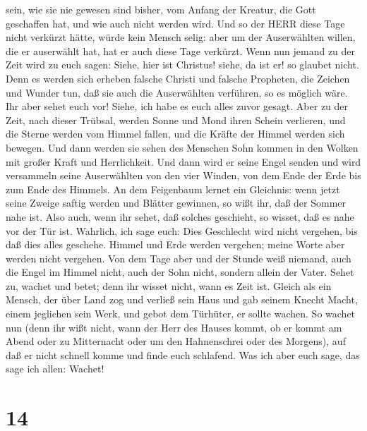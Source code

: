 sein, wie sie nie gewesen sind bisher, vom Anfang der Kreatur, die Gott
geschaffen hat, und wie auch nicht werden wird.  Und so der
HERR diese Tage nicht verkürzt hätte, würde kein Mensch selig: aber um
der Auserwählten willen, die er auserwählt hat, hat er auch diese Tage
verkürzt.  Wenn nun jemand zu der Zeit wird zu euch sagen:
Siehe, hier ist Christus! siehe, da ist er! so glaubet nicht.
 Denn es werden sich erheben falsche Christi und falsche
Propheten, die Zeichen und Wunder tun, daß sie auch die Auserwählten
verführen, so es möglich wäre.  Ihr aber sehet euch vor!
Siehe, ich habe es euch alles zuvor gesagt.  Aber zu der
Zeit, nach dieser Trübsal, werden Sonne und Mond ihren Schein verlieren,
 und die Sterne werden vom Himmel fallen, und die Kräfte
der Himmel werden sich bewegen.  Und dann werden sie sehen
des Menschen Sohn kommen in den Wolken mit großer Kraft und
Herrlichkeit.  Und dann wird er seine Engel senden und wird
versammeln seine Auserwählten von den vier Winden, von dem Ende der Erde
bis zum Ende des Himmels.  An dem Feigenbaum lernet ein
Gleichnis: wenn jetzt seine Zweige saftig werden und Blätter gewinnen,
so wißt ihr, daß der Sommer nahe ist.  Also auch, wenn ihr
sehet, daß solches geschieht, so wisset, daß es nahe vor der Tür ist.
 Wahrlich, ich sage euch: Dies Geschlecht wird nicht
vergehen, bis daß dies alles geschehe.  Himmel und Erde
werden vergehen; meine Worte aber werden nicht vergehen. 
Von dem Tage aber und der Stunde weiß niemand, auch die Engel im Himmel
nicht, auch der Sohn nicht, sondern allein der Vater. 
Sehet zu, wachet und betet; denn ihr wisset nicht, wann es Zeit ist.
 Gleich als ein Mensch, der über Land zog und verließ sein
Haus und gab seinem Knecht Macht, einem jeglichen sein Werk, und gebot
dem Türhüter, er sollte wachen.  So wachet nun (denn ihr
wißt nicht, wann der Herr des Hauses kommt, ob er kommt am Abend oder zu
Mitternacht oder um den Hahnenschrei oder des Morgens), 
auf daß er nicht schnell komme und finde euch schlafend. 
Was ich aber euch sage, das sage ich allen: Wachet!

\hypertarget{section-13}{%
\section{14}\label{section-13}}

